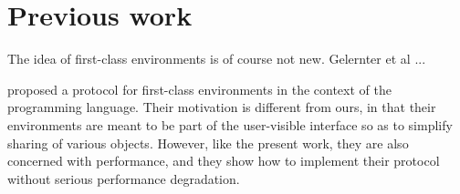 \section{Previous work}

The idea of first-class environments is of course not new.
Gelernter et al \cite{Gelernter:1987:EFC:41625.41634} ...

\cite{Queinnec:1996:SCT:232627.232653} proposed a protocol for
first-class environments in the context of the \scheme{} programming
language.  Their motivation is different from ours, in that their
environments are meant to be part of the user-visible interface so as
to simplify sharing of various objects.  However, like the present
work, they are also concerned with performance, and they show how to
implement their protocol without serious performance degradation.
